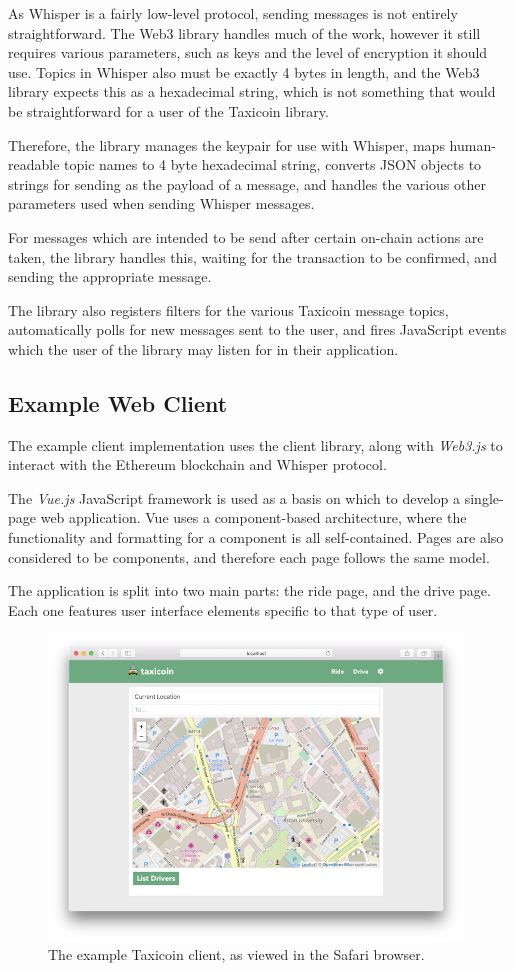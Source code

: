 As Whisper is a fairly low-level protocol, sending messages is not entirely straightforward. The Web3 library handles much of the work, however it still requires various parameters, such as keys and the level of encryption it should use. Topics in Whisper also must be exactly 4 bytes in length, and the Web3 library expects this as a hexadecimal string, which is not something that would be straightforward for a user of the Taxicoin library.

Therefore, the library manages the keypair for use with Whisper, maps human-readable topic names to 4 byte hexadecimal string, converts JSON objects to strings for sending as the payload of a message, and handles the various other parameters used when sending Whisper messages.

For messages which are intended to be send after certain on-chain actions are taken, the library handles this, waiting for the transaction to be confirmed, and sending the appropriate message.

The library also registers filters for the various Taxicoin message topics, automatically polls for new messages sent to the user, and fires JavaScript events which the user of the library may listen for in their application.

\subsection{Example Web Client}

The example client implementation uses the client library, along with \textit{Web3.js} to interact with the Ethereum blockchain and Whisper protocol.

The \textit{Vue.js} JavaScript framework is used as a basis on which to develop a single-page web application. Vue uses a component-based architecture, where the functionality and formatting for a component is all self-contained. Pages are also considered to be components, and therefore each page follows the same model.

The application is split into two main parts: the ride page, and the drive page. Each one features user interface elements specific to that type of user.

\begin{figure}[h]
	\centering
	\includegraphics[width=11cm]{res/webapp.png}
	\caption{The example Taxicoin client, as viewed in the Safari browser.}
\end{figure}

